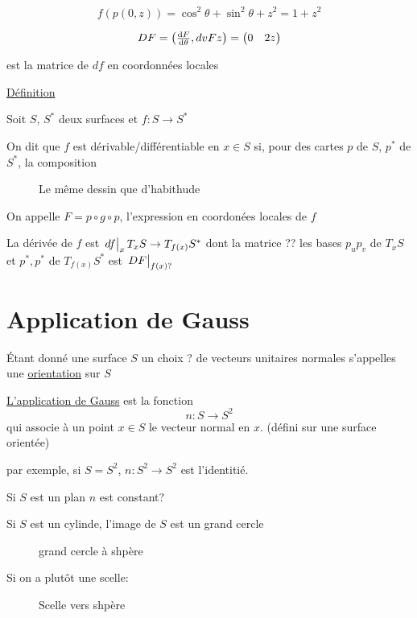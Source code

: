$$f(p(0,z)) = \cos^2\theta + \sin^2\theta +z^2 = 1+z^2$$ 


$$DF = \begin{pmatrix} \dv{F}{\theta}, dv{F}{z} \end{pmatrix} = \begin{pmatrix} 0 & 2z \end{pmatrix}$$ 


est la matrice de $df$ en coordonnées locales


\underline{Définition}  

Soit $S$, $S^*$ deux surfaces et $f: S\to S^*$   

On dit que $f$ est dérivable/différentiable en $x \in S$ si, pour des cartes $p$ de $S$, $p^*$ de $S^*$, la composition 


\begin{figure}[ht]
    \centering
    \caption{Le même dessin que d'habithude}
    \label{fig:le-même-dessin-que-d'habithude}
\end{figure}

On appelle $F = p \circ g \circ p$, l'expression en coordonées locales de $f$

La dérivée de $f$ est $\eval{df}_{x} T_{x} S \to T_{f(x)} S^*$ dont la matrice ?? les bases $p_{u} p_{v}$ de $T_{x} S$ et $p^*, p^*$ de $T_{f(x)}S^*$ est $\eval{DF}_{f(x)?} $  



\section*{Application de Gauss}


Étant donné une surface $S$ un choix ? de vecteurs unitaires normales s'appelles une \underline{orientation} sur $S$   
	
\underline{L'application de Gauss} est la fonction $$n: S \to S^2$$ qui associe à un point $x\in S$ le vecteur normal en $x$. (défini sur une surface orientée)   

par exemple, si $ S = S^2$, $n:S^2 \to S^2$ est l'identitié.

Si $S$ est un plan $n$ est constant?

Si $S$ est un cylinde, l'image de $S$ est un grand cercle

\begin{figure}[ht]
    \centering
    \caption{grand cercle à shpère}
    \label{fig:grand-cercle-à-shpère}
\end{figure}

Si on a plutôt une scelle:

\begin{figure}[ht]
    \centering
    \caption{Scelle vers shpère}
    \label{fig:scelle-vers-shpère}
\end{figure}

